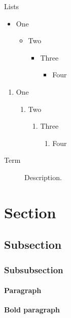 \documentclass{nicrainha}
\begin{document}
\begin{slide}{Lists}
  \begin{itemize}
    \item One \begin{itemize} \item Two \begin{itemize} \item Three
      \begin{itemize} \item Four \end{itemize} \end{itemize} \end{itemize}
  \end{itemize}
  \begin{enumerate}
    \item One \begin{enumerate} \item Two \begin{enumerate} \item Three
      \begin{enumerate} \item Four \end{enumerate} \end{enumerate} \end{enumerate}
  \end{enumerate}
  \begin{description} \item[Term] Description. \end{description}
  \section{Section} \subsection{Subsection} \subsubsection{Subsubsection}
  \paragraph{Paragraph} \textbf{Bold paragraph}
\end{slide}
\end{document}
